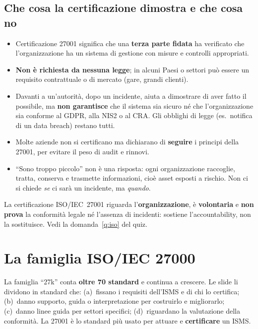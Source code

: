 \subsection{Che cosa la certificazione dimostra e che cosa no}
\begin{itemize}
  \item Certificazione 27001 significa che una \textbf{terza parte fidata} ha verificato che l'organizzazione
    ha un sistema di gestione con misure e controlli appropriati.
  \item \textbf{Non è richiesta da nessuna legge}; in alcuni Paesi o settori può essere un requisito
    contrattuale o di mercato (gare, grandi clienti).
  \item Davanti a un'autorità, dopo un incidente, aiuta a dimostrare di aver fatto il possibile, ma
    \textbf{non garantisce} che il sistema sia sicuro né che l'organizzazione sia conforme al GDPR, alla NIS2 o
    al CRA. Gli obblighi di legge (es.\ notifica di un data breach) restano tutti.
  \item Molte aziende non si certificano ma dichiarano di \textbf{seguire} i principi della 27001, per evitare
    il peso di audit e rinnovi.
  \item ``Sono troppo piccolo'' non è una risposta: ogni organizzazione raccoglie, tratta, conserva e
    trasmette informazioni, cioè asset esposti a rischio. Non ci si chiede \emph{se} ci sarà un incidente, ma
    \emph{quando}.
\end{itemize}

\begin{esame}
La certificazione ISO/IEC~27001 riguarda l'\textbf{organizzazione}, è \textbf{volontaria} e \textbf{non prova}
la conformità legale né l'assenza di incidenti: sostiene l'accountability, non la sostituisce. Vedi la
domanda~\ref{q:iso} del quiz.
\end{esame}

\section{La famiglia ISO/IEC 27000}
\label{sec:iso-famiglia}
La famiglia ``27k'' conta \textbf{oltre 70 standard} e continua a crescere. Le slide li dividono in standard
che: (a)~fissano i requisiti dell'ISMS e di chi lo certifica; (b)~danno supporto, guida o interpretazione
per costruirlo e migliorarlo; (c)~danno linee guida per settori specifici; (d)~riguardano la valutazione
della conformità. La 27001 è lo standard più usato per attuare e \textbf{certificare} un ISMS.

